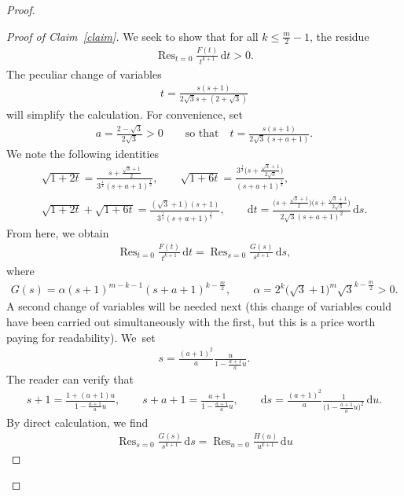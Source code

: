 \begin{proof}
\begin{proof}[Proof of Claim~\ref{claim}]
We seek to show that for all $k\leq \frac{m}{2}-1$, the residue
\begin{gather*}
\operatorname{Res}_{t=0} \frac{F(t)}{t^{k+1}} \,{\mathrm dt}>0.
\end{gather*}
The peculiar change of variables
\begin{gather*}
t=\frac{s(s+1)}{2\sqrt{3}s+(2+\sqrt{3})}
\end{gather*}
will simplify the calculation.
For convenience, set
\begin{gather*}
a=\frac{2-\sqrt{3}}{2\sqrt{3}}>0\qquad\text{so that}\quad t=\frac{s(s+1)}{2\sqrt{3}(s+a+1)}.
\end{gather*}
We note the following identities
\begin{gather*}
\sqrt{1+2t}=\frac{s+\frac{\sqrt{3}+1}{2}}{3^{\frac{1}{4}} (s+a+1)^{\frac{1}{2}}}, \qquad \sqrt{1+6t}=\frac{3^{\frac{1}{4}}\big(s+\frac{\sqrt{3}+1}{2\sqrt{3}}\big)}{(s+a+1)^{\frac{1}{2}}},
\\
\sqrt{1+2t}+\sqrt{1+6t}=\frac{(\sqrt{3}+1)(s+1)}{3^{\frac{1}{4}}(s+a+1)^{\frac{1}{2}}},\qquad
{\mathrm dt}=\frac{\big(s+\frac{\sqrt{3}+1}{2}\big)\big(s+\frac{\sqrt{3}+1}{2\sqrt{3}}\big)}{2\sqrt{3} (s+a+1)^2}\,{\mathrm ds}.
\end{gather*}
From here, we obtain
\begin{gather*}
\operatorname{Res}_{t=0} \frac{F(t)}{t^{k+1}} \,{\mathrm dt}=\operatorname{Res}_{s=0} \frac{G(s)}{s^{k+1}} \,{\mathrm ds},
\end{gather*}
where
\begin{gather*}
G(s)=\alpha (s+1)^{m-k-1} (s+a+1)^{k-\frac{m}{2}}, \qquad
\alpha=2^k \big(\sqrt{3}+1\big)^{m} \sqrt{3}^{k-\frac{m}{2}}>0.
\end{gather*}
A second change of variables will be needed next (this change of variables could have been carried out simultaneously with the first, but this is a price worth paying for readability). We~set
\begin{gather*}
s=\frac{(a+1)^2}{a} \frac{u}{1-\frac{a+1}{a}u}.
\end{gather*}
The reader can verify that
\begin{gather*}
s+1=\frac{1+(a+1)u}{1-\frac{a+1}{a}u}, \qquad s+a+1=\frac{a+1}{1-\frac{a+1}{a}u}, \qquad
{\mathrm ds}=\frac{(a+1)^2}{a} \frac{1}{\big(1-\frac{a+1}{a}u\big)^2}\,{\mathrm du}.
\end{gather*}
By direct calculation, we find
\begin{gather*}
\operatorname{Res}_{s=0} \frac{G(s)}{s^{k+1}}\,{\mathrm ds}=\operatorname{Res}_{u=0} \frac{H(u)}{u^{k+1}}\,{\mathrm du}

\end{gather*}
\end{proof}
\end{proof}
